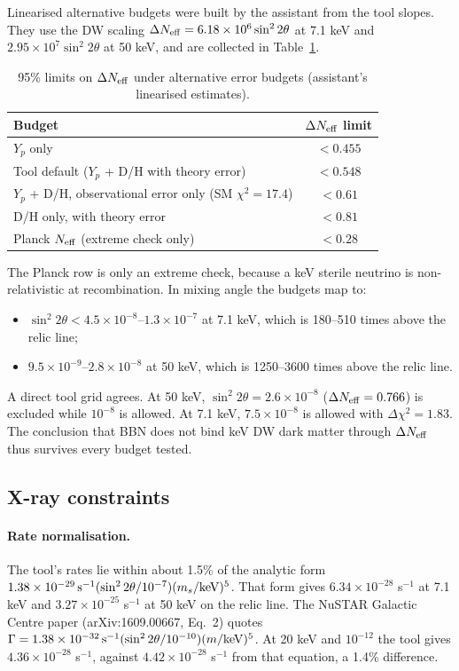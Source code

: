 \documentclass[11pt,a4paper]{article}
\begin{document}
Linearised alternative budgets were built by the assistant from the tool slopes. They use the DW scaling $\Delta N_{\rm eff}=6.18\times10^6\sin^2 2\theta$ at 7.1 keV and $2.95\times10^7\sin^2 2\theta$ at 50 keV, and are collected in Table~\ref{tab:budget}.

\begin{table}[h]
\centering
\caption{95\% limits on $\Delta N_{\rm eff}$ under alternative error budgets (assistant's linearised estimates).}
\label{tab:budget}
\begin{tabular}{lc}
\toprule
Budget & $\Delta N_{\rm eff}$ limit\\
\midrule
$Y_p$ only & $<0.455$\\
Tool default ($Y_p$ + D/H with theory error) & $<0.548$\\
$Y_p$ + D/H, observational error only (SM $\chi^2=17.4$) & $<0.61$\\
D/H only, with theory error & $<0.81$\\
Planck $N_{\rm eff}$ (extreme check only) & $<0.28$\\
\bottomrule
\end{tabular}
\end{table}

The Planck row is only an extreme check, because a keV sterile neutrino is non-relativistic at recombination. In mixing angle the budgets map to:
\begin{itemize}
\item $\sin^2 2\theta<4.5\times10^{-8}$--$1.3\times10^{-7}$ at 7.1 keV, which is 180--510 times above the relic line;
\item $9.5\times10^{-9}$--$2.8\times10^{-8}$ at 50 keV, which is 1250--3600 times above the relic line.
\end{itemize}
A direct tool grid agrees. At 50 keV, $\sin^2 2\theta=2.6\times10^{-8}$ ($\Delta N_{\rm eff}=0.766$) is excluded while $10^{-8}$ is allowed. At 7.1 keV, $7.5\times10^{-8}$ is allowed with $\Delta\chi^2=1.83$. The conclusion that BBN does not bind keV DW dark matter through $\Delta N_{\rm eff}$ thus survives every budget tested.

\subsection{X-ray constraints}

\paragraph{Rate normalisation.} The tool's rates lie within about 1.5\% of the analytic form $1.38\times10^{-29}\,{\rm s^{-1}}(\sin^2 2\theta/10^{-7})(m_s/{\rm keV})^5$. That form gives $6.34\times10^{-28}$ s$^{-1}$ at 7.1 keV and $3.27\times10^{-25}$ s$^{-1}$ at 50 keV on the relic line. The NuSTAR Galactic Centre paper (arXiv:1609.00667, Eq.~2) quotes $\Gamma=1.38\times10^{-32}\,{\rm s^{-1}}(\sin^2 2\theta/10^{-10})(m/{\rm keV})^5$. At 20 keV and $10^{-12}$ the tool gives $4.36\times10^{-28}$ s$^{-1}$, against $4.42\times10^{-28}$ s$^{-1}$ from that equation, a 1.4\% difference.
\end{document}
